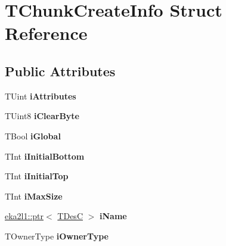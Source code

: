 \hypertarget{struct_t_chunk_create_info}{}\section{T\+Chunk\+Create\+Info Struct Reference}
\label{struct_t_chunk_create_info}
\subsection*{Public Attributes}
\begin{DoxyCompactItemize}
\item 
\mbox{\label{struct_t_chunk_create_info_a78af0b24fb3296db52da878f67cd01b0}} 
T\+Uint {\bfseries i\+Attributes}
\item 
\mbox{\label{struct_t_chunk_create_info_a4e9ee810b4c85f4134a3057c8678eb99}} 
T\+Uint8 {\bfseries i\+Clear\+Byte}
\item 
\mbox{\label{struct_t_chunk_create_info_a3634de93d7c26889ea1c03865e8607af}} 
T\+Bool {\bfseries i\+Global}
\item 
\mbox{\label{struct_t_chunk_create_info_a5f676369fe3fe279c80768556bee0ce3}} 
T\+Int {\bfseries i\+Initial\+Bottom}
\item 
\mbox{\label{struct_t_chunk_create_info_ab9bd657e41e71ea8a011900fe06257b3}} 
T\+Int {\bfseries i\+Initial\+Top}
\item 
\mbox{\label{struct_t_chunk_create_info_ab84e6077f99e581d5aad4aa8e5ef41af}} 
T\+Int {\bfseries i\+Max\+Size}
\item 
\mbox{\label{struct_t_chunk_create_info_ad205939e82c802aea574c4caa0fc3a03}} 
\mbox{\hyperlink{classeka2l1_1_1ptr}{eka2l1\+::ptr}}$<$ \mbox{\hyperlink{struct_t_des_c16}{T\+DesC}} $>$ {\bfseries i\+Name}
\item 
\mbox{\label{struct_t_chunk_create_info_ade9f1fb414bb8f13c6bd90b39a528dab}} 
T\+Owner\+Type {\bfseries i\+Owner\+Type}
\item 

\end{DoxyCompactItemize}
